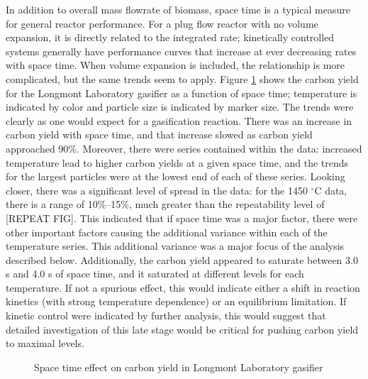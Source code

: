 \documentclass[11pt,twocolumn]{article}
\begin{document}
In addition to overall mass flowrate of biomass, space time is a typical measure for general reactor performance.  For a plug flow reactor with no volume expansion, it is directly related to the integrated rate; kinetically controlled systems generally have performance curves that increase at ever decreasing rates with space time.  When volume expansion is included, the relationship is more complicated, but the same trends seem to apply.  Figure \ref{fig-Lab-Xg-tau} shows the carbon yield for the Longmont Laboratory gasifier as a function of space time; temperature is indicated by color and particle size is indicated by marker size.  The trends were clearly as one would expect for a gasification reaction.  There was an increase in carbon yield with space time, and that increase slowed as carbon yield approached 90\%.  Moreover, there were series contained within the data: increased temperature lead to higher carbon yields at a given space time, and the trends for the largest particles were at the lowest end of each of these series.  Looking closer, there was a significant level of spread in the data: for the 1450 $^{\circ}$C data, there is a range of 10\%--15\%, much greater than the repeatability level of [REPEAT FIG].  This indicated that if space time was a major factor, there were other important factors causing the additional variance within each of the temperature series.  This additional variance was a major focus of the analysis described below.  Additionally, the carbon yield appeared to saturate between 3.0 s and 4.0 s of space time, and it saturated at different levels for each temperature.  If not a spurious effect, this would indicate either a shift in reaction kinetics (with strong temperature dependence) or an equilibrium limitation.  If kinetic control were indicated by further analysis, this would suggest that detailed investigation of this late stage would be critical for pushing carbon yield to maximal levels. 

\begin{figure}[hp]

\caption{Space time effect on carbon yield in Longmont Laboratory gasifier}
\label{fig-Lab-Xg-tau}
\end{figure}
\end{document}
